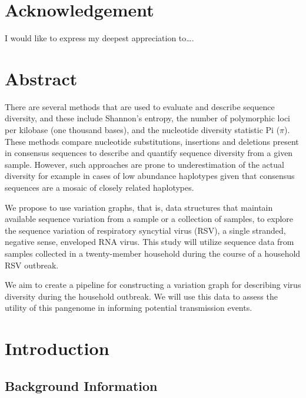 \documentclass[10pt, a4paper]{article}
\begin{document}
\newpage
\section{Acknowledgement}
\label{sec:org7a8ee52}
I would like to express my deepest appreciation to\ldots{}.

\newpage
\pagewidth
\section{Abstract}
\label{sec:orgb8f4866}
\begin{ABSTRACT}
There are several methods that are used to evaluate and describe sequence
diversity, and these include Shannon's entropy, the number of polymorphic loci
per kilobase (one thousand bases), and the nucleotide diversity statistic Pi
(\(\pi\)).
These methods compare nucleotide substitutions, insertions and deletions
present  in consensus sequences to describe and quantify sequence diversity
from a given sample.
However, such approaches are prone to underestimation of the actual
diversity for example in cases of low abundance haplotypes given that consensus
sequences are a mosaic of closely related haplotypes.

We propose to use variation graphs, that is, data structures that maintain
available sequence variation from a sample or a collection of samples, to
explore the sequence variation of respiratory syncytial virus (RSV), a single
stranded, negative sense, enveloped RNA virus. This study will utilize sequence
data from samples collected in a twenty-member household during the course of a
household RSV outbreak.

We aim to create a pipeline for constructing a variation graph for describing
virus diversity during the household outbreak. We will use this data to assess
the utility of this pangenome in informing potential transmission events.
\end{ABSTRACT}
\setcounter{secnumdepth}{4}

\newpage
\tableofcontents

\newpage
\listoffigures

\newpage
{}

\section{Introduction}
\label{sec:orgbfc5246}
\subsection{Background Information}
\label{sec:org733f180}
\end{document}
